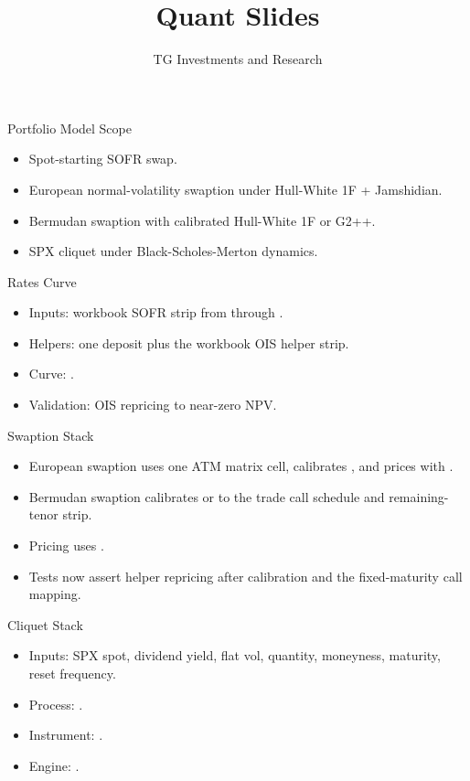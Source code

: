 \documentclass[aspectratio=169]{beamer}
\title{Quant Slides}
\subtitle{\product}
\author{TG Investments and Research}
\date{\docdate}
\begin{document}
\frame{\titlepage}

\begin{frame}{Portfolio Model Scope}
\begin{itemize}
    \item Spot-starting SOFR swap.
    \item European normal-volatility swaption under Hull-White 1F + Jamshidian.
    \item Bermudan swaption with calibrated Hull-White 1F or G2++.
    \item SPX cliquet under Black-Scholes-Merton dynamics.
\end{itemize}
\end{frame}

\begin{frame}{Rates Curve}
\begin{itemize}
    \item Inputs: workbook SOFR strip from  through .
    \item Helpers: one deposit plus the workbook OIS helper strip.
    \item Curve: .
    \item Validation: OIS repricing to near-zero NPV.
\end{itemize}
\end{frame}

\begin{frame}{Swaption Stack}
\begin{itemize}
    \item European swaption uses one ATM matrix cell, calibrates , and prices with .
    \item Bermudan swaption calibrates  or  to the trade call schedule and remaining-tenor strip.
    \item Pricing uses .
    \item Tests now assert helper repricing after calibration and the fixed-maturity call mapping.
\end{itemize}
\end{frame}

\begin{frame}{Cliquet Stack}
\begin{itemize}
    \item Inputs: SPX spot, dividend yield, flat vol, quantity, moneyness, maturity, reset frequency.
    \item Process: .
    \item Instrument: .
    \item Engine: .
\end{itemize}
\end{frame}
\end{document}
